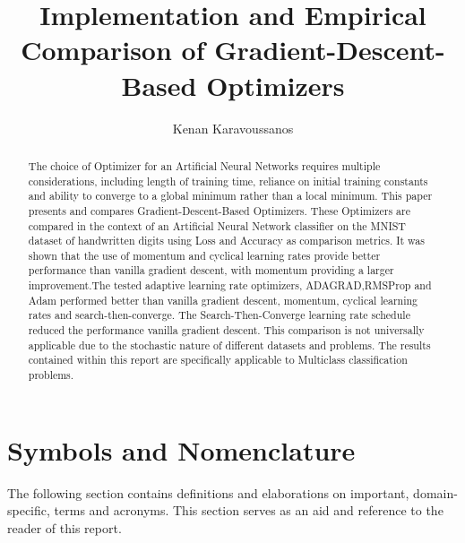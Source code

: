 \documentclass{article}
\title{Implementation and Empirical Comparison of Gradient-Descent-Based Optimizers}
\author{Kenan Karavoussanos}
\begin{document}
\maketitle
\begin{abstract}	
	
	The choice of Optimizer for an Artificial Neural Networks requires multiple considerations, including length of training time, reliance on initial training constants and ability to converge to a global minimum rather than a local minimum. This paper presents and compares Gradient-Descent-Based Optimizers. These Optimizers are compared in the context of an Artificial Neural Network classifier on the MNIST dataset of handwritten digits using Loss and Accuracy as comparison metrics. It was shown that the use of momentum and cyclical learning rates provide better performance than vanilla gradient descent, with momentum providing a larger improvement.The tested adaptive learning rate optimizers, ADAGRAD,RMSProp and Adam performed better than vanilla gradient descent, momentum, cyclical learning rates and search-then-converge. The Search-Then-Converge learning rate schedule reduced the performance vanilla gradient descent. This comparison is not universally applicable due to the stochastic nature of different datasets and problems. The results contained within this report are specifically applicable to Multiclass classification problems.
\end{abstract}	
\thispagestyle{empty}
\newpage
\clearpage
\setcounter{page}{1}
\tableofcontents
\newpage
\section*{Symbols and Nomenclature}
The following section contains definitions and elaborations on important, domain-specific, terms and acronyms. This section serves as an aid and reference to the reader of this report.
\end{document}
